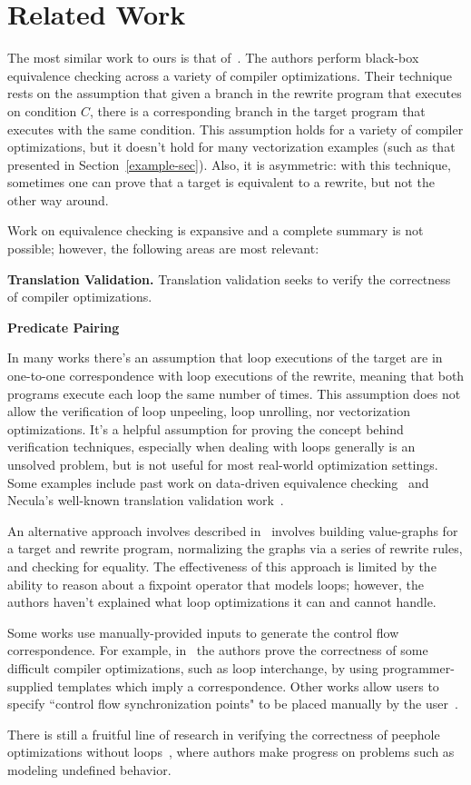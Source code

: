 \section{Related Work}

The most similar work to ours is that of~\cite{Dahiya17ASPLAS}. The
authors perform black-box equivalence checking across a variety of
compiler optimizations. Their technique rests on the assumption that
given a branch in the rewrite program that executes on condition $C$,
there is a corresponding branch in the target program that executes
with the same condition. This assumption holds for a variety of
compiler optimizations, but it doesn't hold for many vectorization
examples (such as that presented in Section~\ref{example-sec}). Also,
it is asymmetric: with this technique, sometimes one can prove that a
target is equivalent to a rewrite, but not the other way around.

Work on equivalence checking is expansive and a complete summary is
not possible; however, the following areas are most relevant:

\textbf{Translation Validation.}  Translation validation seeks to verify the correctness of compiler optimizations.

\textbf{Predicate Pairing}

In many works there's an assumption that loop executions of the
target are in one-to-one correspondence with loop executions of the
rewrite, meaning that both programs execute each loop the same number
of times. This assumption does not allow the verification of loop
unpeeling, loop unrolling, nor vectorization optimizations. It's
a helpful assumption for proving the concept behind verification
techniques, especially when dealing with loops generally is an
unsolved problem, but is not useful for most real-world optimization
settings. Some examples include past work on data-driven equivalence
checking~\cite{Sharma2013} and Necula's well-known translation
validation work~\cite{Necula2000}.

An alternative approach involves described in~\cite{Tristan2011}
involves building value-graphs for a target and rewrite program,
normalizing the graphs via a series of rewrite rules, and checking for
equality. The effectiveness of this approach is limited by the ability
to reason about a fixpoint operator that models loops; however, the
authors haven't explained what loop optimizations it can and cannot
handle.

Some works use manually-provided inputs to generate the control flow
correspondence. For example, in~\cite{Kundu2009} the authors prove
the correctness of some difficult compiler optimizations, such as
loop interchange, by using programmer-supplied templates which imply
a correspondence. Other works allow users to specify ``control flow
synchronization points" to be placed manually by the user~\cite{Kiefer2016}.

There is still a fruitful line of research in verifying the
correctness of peephole optimizations without loops~\cite{Lopes2015},
where authors make progress on problems such as modeling undefined
behavior.


